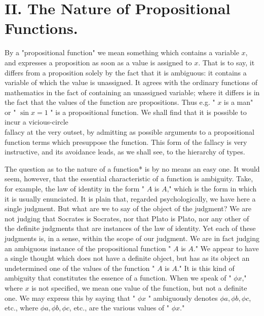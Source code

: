 \documentclass[10pt]{article}
\begin{document}
\section*{II. The Nature of Propositional Functions.}
By a "propositional function" we mean something which contains a variable $x$, and expresses a proposition as soon as a value is assigned to $x$. That is to say, it differs from a proposition solely by the fact that it is ambiguous: it contains a variable of which the value is unassigned. It agrees with the ordinary functions of mathematics in the fact of containing an unassigned variable; where it differs is in the fact that the values of the function are propositions. Thus e.g. " $x$ is a man" or " $\sin x=1$ " is a propositional function. We shall find that it is possible to incur a vicious-circle\\
fallacy at the very outset, by admitting as possible arguments to a propositional function terms which presuppose the function. This form of the fallacy is very instructive, and its avoidance leads, as we shall see, to the hierarchy of types.

The question as to the nature of a function* is by no means an easy one. It would seem, however, that the essential characteristic of a function is ambiguity. Take, for example, the law of identity in the form " $A$ is $A$," which is the form in which it is usually enunciated. It is plain that, regarded psychologically, we have here a single judgment. But what are we to say of the object of the judgment? We are not judging that Socrates is Socrates, nor that Plato is Plato, nor any other of the definite judgments that are instances of the law of identity. Yet each of these judgments is, in a sense, within the scope of our judgment. We are in fact judging an ambiguous instance of the propositional function " $A$ is $A$." We appear to have a single thought which does not have a definite object, but has as its object an undetermined one of the values of the function " $A$ is $A$." It is this kind of ambiguity that constitutes the essence of a function. When we speak of " $\phi x$," where $x$ is not specified, we mean one value of the function, but not a definite one. We may express this by saying that " $\phi x$ " ambiguously denotes $\phi a, \phi b, \phi c$, etc., where $\phi a, \phi b, \phi c$, etc., are the various values of " $\phi x$."
\end{document}

